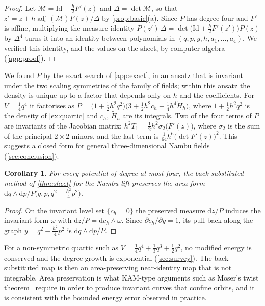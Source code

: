 \documentclass[11pt,a4paper]{article}
\newtheorem{corollary}[theorem]{Corollary}
\theoremstyle{definition}
\theoremstyle{remark}
\newcommand{\Id}{\mathrm{Id}}
\newcommand{\dd}{\mathrm{d}}
\begin{document}
\begin{proof}
Let $\mathcal M=\Id-\frac h2F'(z)$ and $\Delta=\det\mathcal M$, so that $z'=z+h\operatorname{adj}(\mathcal M)F(z)/\Delta$
by \cref{prop:basic}(a). Since $P$ has degree four and $F'$ is affine, multiplying the measure
identity $P(z')\,\Delta=\det\big(\Id+\frac h2F'(z')\big)P(z)$ by $\Delta^4$ turns it into an identity between
polynomials in $(q,p,y,h,a_1,\dots,a_4)$. We verified this identity, and the values on the sheet, by computer
algebra (\cref{app:proof}).
\end{proof}

We found $P$ by the exact search of \cref{app:exact}, in an ansatz that is invariant under the two scaling
symmetries of the family of fields; within this ansatz the density is unique up to a factor that depends only on
$h$ and the coefficients. For
$V=\frac14q^4$ it factorises as $P=\big(1+\frac12h^2q^2\big)\big(3+\frac12h^2c_h-\frac14h^4\tilde H_h\big)$, where
$1+\frac12h^2q^2$ is the density of \cref{ex:quartic} and $c_h$, $\tilde H_h$ are its integrals. Two of the four
terms of $P$ are invariants of the Jacobian matrix: $h^2T_1=\frac12h^2\sigma_2\big(F'(z)\big)$, where $\sigma_2$ is the
sum of the principal $2\times2$ minors, and the last term is $\frac1{64}h^6\big(\det F'(z)\big)^2$. This suggests a
closed form for general three-dimensional Nambu fields (\cref{sec:conclusion}).

\begin{corollary}\label{cor:area}
For every potential of degree at most four, the back-substituted method of \cref{thm:sheet} for the Nambu lift
preserves the area form $\dd q\wedge\dd p/P\big(q,p,q^2-\frac{h^2}4p^2\big)$.
\end{corollary}

\begin{proof}
On the invariant level set $\{c_h=0\}$ the preserved measure $\dd z/P$ induces the invariant form $\omega$
with $\dd z/P=\dd c_h\wedge\omega$. Since $\partial c_h/\partial y=1$, its pull-back along the graph
$y=q^2-\frac{h^2}4p^2$ is $\dd q\wedge\dd p/P$.
\end{proof}

For a non-symmetric quartic such as $V=\frac14q^4+\frac13q^3+\frac12q^2$, no modified energy is conserved and
the degree growth is exponential (\cref{sec:survey}). The back-substituted map is then an area-preserving
near-identity map that is not integrable. Area preservation is what KAM-type arguments such as Moser's twist
theorem~\cite{Moser62} require in order to produce invariant curves that confine orbits, and it is consistent
with the bounded energy error observed in practice.
\end{document}
